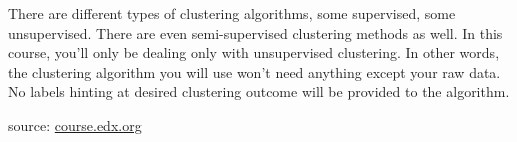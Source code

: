 \documentclass{article}
\begin{document}
\par There are different types of clustering algorithms, some supervised, some unsupervised. There are even semi-supervised clustering methods as well. In this course, you'll only be dealing only with unsupervised clustering. In other words, the clustering algorithm you will use won't need anything except your raw data. No labels hinting at desired clustering outcome will be provided to the algorithm.

\begin{flushright}
    source: \href{https://courses.edx.org/courses/course-v1:Microsoft+DAT210x+6T2016/courseware/e36e6b45ae5d4032bef2ec557c1ff48f/a8cf8333f6044e9b9a357b7797f282e3/?child=first}{course.edx.org}  
\end{flushright}
\end{document}
